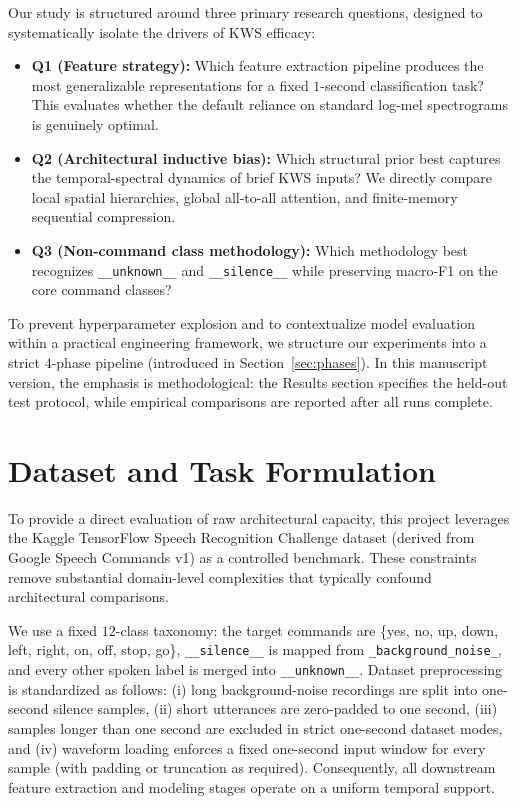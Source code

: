 \documentclass[cameraready]{Interspeech}
\begin{document}
Our study is structured around three primary research questions, designed to systematically isolate the drivers of KWS efficacy:
\begin{itemize}
    \item \textbf{Q1 (Feature strategy):} Which feature extraction pipeline produces the most generalizable representations for a fixed $1$-second classification task? This evaluates whether the default reliance on standard log-mel spectrograms is genuinely optimal.
    \item \textbf{Q2 (Architectural inductive bias):} Which structural prior best captures the temporal-spectral dynamics of brief KWS inputs? We directly compare local spatial hierarchies, global all-to-all attention, and finite-memory sequential compression.
    \item \textbf{Q3 (Non-command class methodology):} Which methodology best recognizes \texttt{\_\_unknown\_\_} and \texttt{\_\_silence\_\_} while preserving macro-F1 on the core command classes?
\end{itemize}

To prevent hyperparameter explosion and to contextualize model evaluation within a practical engineering framework, we structure our experiments into a strict $4$-phase pipeline (introduced in Section~\ref{sec:phases}). In this manuscript version, the emphasis is methodological: the Results section specifies the held-out test protocol, while empirical comparisons are reported after all runs complete.

\section{Dataset and Task Formulation}
\label{sec:dataset}
To provide a direct evaluation of raw architectural capacity, this project leverages the Kaggle TensorFlow Speech Recognition Challenge dataset (derived from Google Speech Commands v1) \cite{warden2018speech} as a controlled benchmark. These constraints remove substantial domain-level complexities that typically confound architectural comparisons.

We use a fixed $12$-class taxonomy: the target commands are \{yes, no, up, down, left, right, on, off, stop, go\}, \texttt{\_\_silence\_\_} is mapped from \texttt{\_background\_noise\_}, and every other spoken label is merged into \texttt{\_\_unknown\_\_}. Dataset preprocessing is standardized as follows: (i) long background-noise recordings are split into one-second silence samples, (ii) short utterances are zero-padded to one second, (iii) samples longer than one second are excluded in strict one-second dataset modes, and (iv) waveform loading enforces a fixed one-second input window for every sample (with padding or truncation as required). Consequently, all downstream feature extraction and modeling stages operate on a uniform temporal support.
\end{document}
